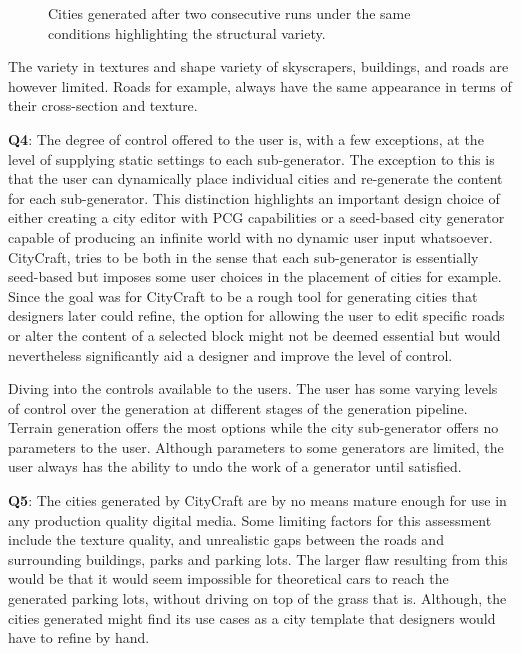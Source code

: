 \begin{figure}[h!]
\begin{subfigure}[b]{0.45\textwidth}
  \end{subfigure}
  \caption{Cities generated after two consecutive runs under the same conditions highlighting the structural variety.}
  \label{fig:discussion_city_layout_variety}
\end{figure}

The variety in textures and shape variety of skyscrapers, buildings, and roads are however limited.
Roads for example, always have the same appearance in terms of their cross-section and texture.

\textbf{Q4}:
The degree of control offered to the user is, with a few exceptions, at the level of supplying static settings to each sub-generator.
The exception to this is that the user can dynamically place individual cities and re-generate the content for each sub-generator.
This distinction highlights an important design choice of either creating a city editor with PCG capabilities or a seed-based city generator capable of producing an infinite world with no dynamic user input whatsoever.
CityCraft, tries to be both in the sense that each sub-generator is essentially seed-based but imposes some user choices in the placement of cities for example.
Since the goal was for CityCraft to be a rough tool for generating cities that designers later could refine, the option for allowing the user to edit specific roads or alter the content of a selected block might not be deemed essential but would nevertheless significantly aid a designer and improve the level of control.

Diving into the controls available to the users.
The user has some varying levels of control over the generation at different stages of the generation pipeline.
Terrain generation offers the most options while the city sub-generator offers no parameters to the user. 
Although parameters to some generators are limited, the user always has the ability to undo the work of a generator until satisfied.

\textbf{Q5}:
The cities generated by CityCraft are by no means mature enough for use in any production quality digital media.
Some limiting factors for this assessment include the texture quality, and unrealistic gaps between the roads and surrounding buildings, parks and parking lots.
The larger flaw resulting from this would be that it would seem impossible for theoretical cars to reach the generated parking lots, without driving on top of the grass that is.
Although, the cities generated might find its use cases as a city template that designers would have to refine by hand.

